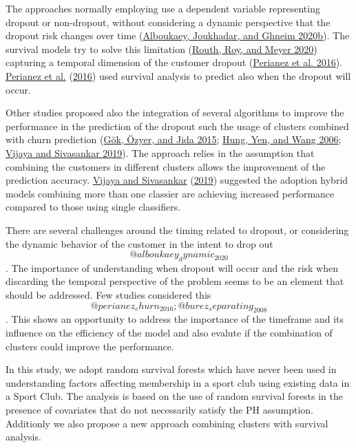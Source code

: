 \documentclass[
  12pt,
]{article}
\begin{document}
The approaches normally employing use a dependent variable representing dropout
or non-dropout, without considering a dynamic perspective that the dropout risk
changes over time (\protect\hyperlink{ref-Alboukaey_dynamic_2020}{Alboukaey, Joukhadar, and Ghneim 2020b}). The survival models try to solve
this limitation (\protect\hyperlink{ref-routh_estimating_2020}{Routh, Roy, and Meyer 2020}) capturing a temporal dimension of the
customer dropout (\protect\hyperlink{ref-perianez_churn_2016}{Perianez et al. 2016}). \protect\hyperlink{ref-perianez_churn_2016}{Perianez et al.} (\protect\hyperlink{ref-perianez_churn_2016}{2016}) used survival
analysis to predict also when the dropout will occur.

Other studies proposed also the integration of several algorithms to improve the
performance in the prediction of the dropout such the usage of clusters combined
with churn prediction (\protect\hyperlink{ref-gok_case_2015}{Gök, Özyer, and Jida 2015}; \protect\hyperlink{ref-hung_applying_2006}{Hung, Yen, and Wang 2006}; \protect\hyperlink{ref-vijaya_sivasankar_2019}{Vijaya and Sivasankar 2019}). The approach relies in the assumption that combining
the customers in different clusters allows the improvement of the prediction
accuracy. \protect\hyperlink{ref-vijaya_sivasankar_2019}{Vijaya and Sivasankar} (\protect\hyperlink{ref-vijaya_sivasankar_2019}{2019}) suggested the adoption hybrid models combining
more than one classier are achieving increased performance compared to those
using single classifiers.

There are several challenges around the timing related to dropout, or
considering the dynamic behavior of the customer in the intent to drop out
\[@alboukaey_dynamic_2020\]. The importance of understanding when dropout will
occur and the risk when discarding the temporal perspective of the problem seems
to be an element that should be addressed. Few studies considered this
\[@perianez_churn_2016; @burez_separating_2008\]. This shows an opportunity to
address the importance of the timeframe and its influence on the efficiency of
the model and also evalute if the combination of clusters could improve the
performance.

In this study, we adopt random survival forests which have never been used in
understanding factors affecting membership in a sport club using existing data
in a Sport Club. The analysis is based on the use of random survival forests in
the presence of covariates that do not necessarily satisfy the PH assumption.
Additionly we also propose a new approach combining clusters with survival
analysis.
\end{document}
